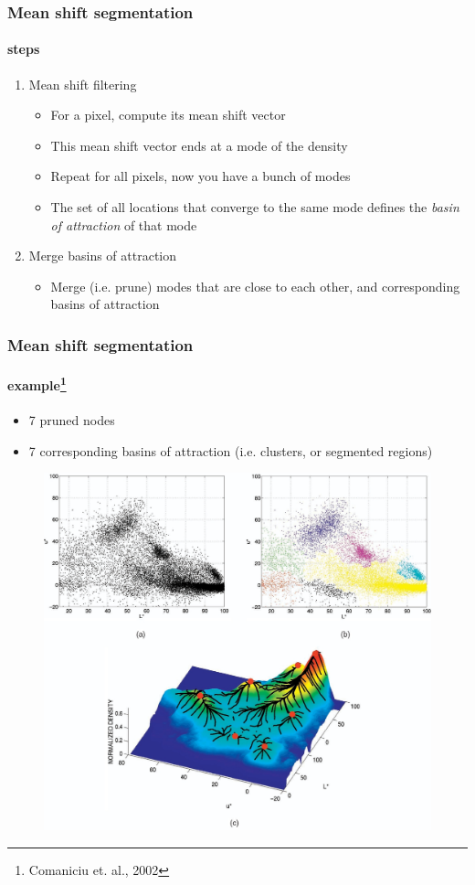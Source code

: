 \begin{frame}
\frametitle{Mean shift segmentation}
\framesubtitle{steps}
\logoCSIPCPL\mypagenum
	\begin{enumerate}				
		\item {\color{red}Mean shift filtering}
			\begin{itemize}
				\item For a pixel, compute its mean shift vector
				\item This mean shift vector ends at a mode of the density
				\item Repeat for all pixels, now you have a bunch of modes
				\item The set of all locations that converge to the same mode defines the  \emph {basin of attraction} of that mode
			\end{itemize}
		\item  {\color{red}Merge basins of attraction}
			\begin{itemize}
				\item Merge (i.e. prune) modes that are close to each other, and corresponding basins of attraction
			\end{itemize}
	\end{enumerate}
\end{frame}




\begin{frame}
\frametitle{Mean shift segmentation}
\framesubtitle{example\footnote{Comaniciu et. al., 2002}}
\logoCSIPCPL\mypagenum
	\begin{itemize}				
		\item 7 pruned nodes
		\item 7 corresponding basins of attraction (i.e. clusters, or segmented regions)
	\end{itemize}
	\begin{figure}
		\includegraphics[height=0.6\textheight]{figs/PRML_meanShift2.pdf}
	\end{figure}
\end{frame}




